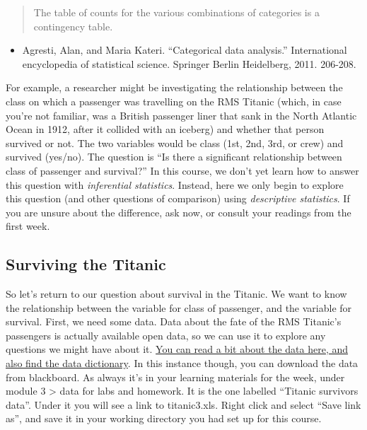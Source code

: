 \documentclass[
]{book}
\providecommand{\tightlist}{%
  \setlength{\itemsep}{0pt}\setlength{\parskip}{0pt}}
\begin{document}
\begin{quote}
The table of counts for the various combinations of categories is a contingency table.
\end{quote}

\begin{itemize}
\tightlist
\item
  Agresti, Alan, and Maria Kateri. ``Categorical data analysis.'' International encyclopedia of statistical science. Springer Berlin Heidelberg, 2011. 206-208.
\end{itemize}

For example, a researcher might be investigating the relationship between the class on which a passenger was travelling on the RMS Titanic (which, in case you're not familiar, was a British passenger liner that sank in the North Atlantic Ocean in 1912, after it collided with an iceberg) and whether that person survived or not. The two variables would be class (1st, 2nd, 3rd, or crew) and survived (yes/no). The question is ``Is there a significant relationship between class of passenger and survival?'' In this course, we don't yet learn how to answer this question with \emph{inferential statistics}. Instead, here we only begin to explore this question (and other questions of comparison) using \emph{descriptive statistics}. If you are unsure about the difference, ask now, or consult your readings from the first week.

\hypertarget{surviving-the-titanic}{%
\subsection{Surviving the Titanic}\label{surviving-the-titanic}}

So let's return to our question about survival in the Titanic. We want to know the relationship between the variable for class of passenger, and the variable for survival. First, we need some data. Data about the fate of the RMS Titanic's passengers is actually available open data, so we can use it to explore any questions we might have about it. \href{http://www.public.iastate.edu/~hofmann/data/titanic.html}{You can read a bit about the data here, and also find the data dictionary}. In this instance though, you can download the data from blackboard. As always it's in your learning materials for the week, under module 3 \textgreater{} data for labs and homework. It is the one labelled ``Titanic survivors data''. Under it you will see a link to titanic3.xls. Right click and select ``Save link as'', and save it in your working directory you had set up for this course.
\end{document}
